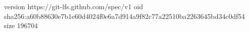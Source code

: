 version https://git-lfs.github.com/spec/v1
oid sha256:a60b88630e7b1e60d4024f0e6a7d914a9f82c77a22510ba2263645bd34c0df54
size 196704
